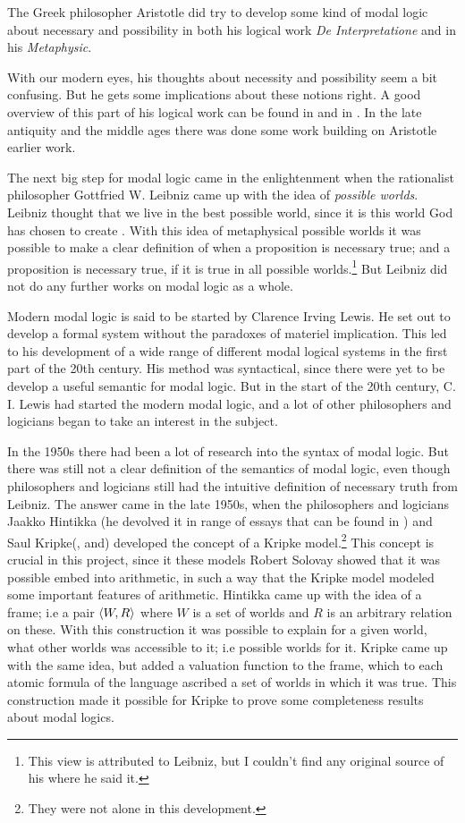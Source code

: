 \documentclass[../main.tex]{subfiles}
\begin{document}
The Greek philosopher Aristotle did try to develop some kind of modal logic
about necessary and possibility in both his logical work \textit{De
Interpretatione} and in his
 \textit{Metaphysic}.

With our modern eyes, his thoughts about necessity  and possibility seem a
bit confusing. But he gets some implications about these notions right. A good
overview of this part of his logical work can be found in \citet{Lemmon1977} and
in \citet{Luka1957}.
In the late antiquity and the middle ages there was done some work building on 
Aristotle earlier work. 

The next big step for modal logic came in the enlightenment when the
rationalist philosopher Gottfried W. Leibniz came up with the idea of \textit{possible
worlds}.  Leibniz thought that we live in the best possible world, since it is
this world God has chosen to create \parencite{Leibniz1760}. With this idea of metaphysical possible
worlds it was possible to make a clear definition of when a proposition is
necessary true; and a proposition is necessary true, if it is true in all
possible worlds.\footnote{This view is attributed to Leibniz, but I couldn't
find any original source of his where he said it.}
But Leibniz did not do any further works on modal logic as a
whole.

Modern modal logic is said to be started by Clarence Irving Lewis. He set out
to develop a formal system without the paradoxes of materiel
implication. This led to his development of a wide range of different modal
logical systems in the first part of the 20th century. His method was
syntactical, since there were yet to be develop a useful semantic for modal
logic. But in the start of the 20th century, C. I. Lewis had started the modern
modal logic, and a lot of other philosophers and logicians began to take an
interest in the subject.


In the 1950s there had been a lot of research into the syntax of modal logic.
But there was still not a clear definition of the semantics of modal logic,
even though philosophers and logicians still had the intuitive definition of
necessary truth from Leibniz. The answer came in the late 1950s, when the
philosophers and logicians Jaakko Hintikka (he devolved it in range of essays
that can be found in \citet{Hintikka1969})
and Saul Kripke(\citet{Kripke1959a}, \citet{Kripke1959b} and\citet{Kripke1963}) developed the concept of a Kripke model.\footnote{They were not
	alone in this development.} This concept is crucial in this project,
since it these models Robert Solovay showed that it was possible embed into
arithmetic, in such a way that the Kripke model modeled some important features
of arithmetic.
Hintikka came up with the idea of a frame; i.e a pair $\langle W,R\rangle$ where $W$ is
a set of worlds and $R$ is an arbitrary relation on these. With this
construction it was possible to explain for a given world, what other worlds
was accessible to it; i.e possible worlds for it. Kripke came up with the same
idea, but added a valuation function to the frame, which to each atomic formula of the
language ascribed a set of worlds in which it was true.  This construction made
it possible for Kripke to prove some completeness results about modal logics.
\end{document}
